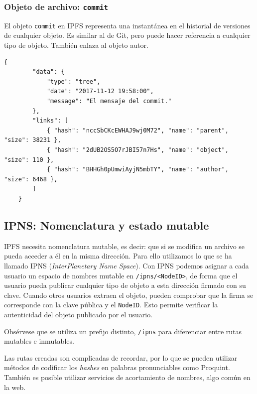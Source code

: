 \documentclass[12pt]{article} %
\begin{document}

\subsubsection{Objeto de archivo: \texttt{commit}} %
\label{ssub:objeto_de_archivo_commit}

El objeto \texttt{commit} en IPFS representa una instantánea en el historial de versiones de cualquier objeto. Es similar al de Git, pero puede hacer referencia a cualquier tipo de objeto. También enlaza al objeto autor.

\begin{lstlisting}[caption={Estructura JSON de un \texttt{commit}.}]
	{
		"data": {
			"type": "tree",
			"date": "2017-11-12 19:58:00",
			"message": "El mensaje del commit."
		},
		"links": [
			{ "hash": "nccSbCKcEWHAJ9wj0M72", "name": "parent", "size": 38231 },
			{ "hash": "2dUB2OS5O7rJBI57n7Hs", "name": "object", "size": 110 },
			{ "hash": "BHHGh0pUmwiAyjN5mbTY", "name": "author", "size": 6468 },
		]
	}
\end{lstlisting}



\subsection{IPNS: Nomenclatura y estado mutable} %
\label{sub:ipns_denominación_y_estado_mutable}

IPFS necesita nomenclatura mutable, es decir: que si se modifica un archivo se pueda acceder a él en la misma dirección. Para ello utilizamos lo que se ha llamado IPNS (\textit{InterPlanetary Name Space}). Con IPNS podemos asignar a cada usuario un espacio de nombres mutable en \texttt{/ipns/<NodeID>}, de forma que el usuario pueda publicar cualquier tipo de objeto a esta dirección firmado con su clave. Cuando otros usuarios extraen el objeto, pueden comprobar que la firma se corresponde con la clave pública y el \texttt{NodeID}. Esto permite verificar la autenticidad del objeto publicado por el usuario.

Obsérvese que se utiliza un prefijo distinto, \texttt{/ipns} para diferenciar entre rutas mutables e inmutables. 

Las rutas creadas son complicadas de recordar, por lo que se pueden utilizar métodos de codificar los \textit{hashes} en palabras pronunciables como Proquint\cite{proquint}. También es posible utilizar servicios de acortamiento de nombres, algo común en la web.
\end{document}
